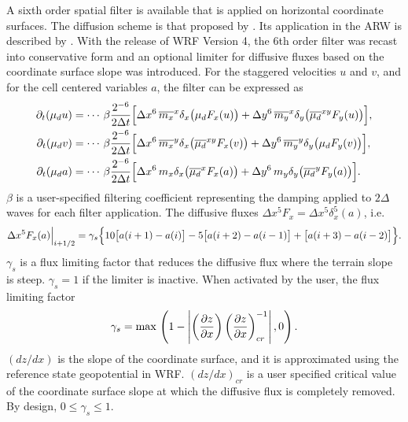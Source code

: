 A sixth order spatial filter is available that is applied on horizontal
coordinate surfaces.  
The diffusion scheme is that proposed by \cite{xue.2000}.  Its application
in the ARW is described by \cite{knievel.et.al.2007}.  With the release of WRF Version 4, the 6th order filter was recast into conservative form and an optional limiter for diffusive fluxes based on the coordinate surface slope was introduced.  For the staggered velocities $u$ and $v$, and for the cell centered variables $a$, the filter can be expressed as
%
%
\begin{align}
\partial_t (\mu_d u) &= \cdots \, \beta {2^{-6} \over 2 \Delta t} 
\Big[ \Delta x^6 \, \overline{m_x}^x \delta_x \big({\mu_d} F_x(u)\big) + \Delta y^6  \,\overline{m_y}^x \delta_y \big(\overline{\mu_d}^{xy} F_y(u)\big)\Big],
\label{filter6_u} \\
%
\partial_t (\mu_d v) &= \cdots \, \beta {2^{-6} \over 2 \Delta t} 
\Big[ \Delta x^6 \, \overline{m_x}^y \delta_x \big(\overline{\mu_d}^{xy} F_x(v)\big) + \Delta y^6  \,\overline{m_y}^y \delta_y \big({\mu_d} F_y(v)\big)\Big],
\label{filter6_v} \\
%
\partial_t (\mu_d a) &= \cdots \, \beta {2^{-6} \over 2 \Delta t} 
\Big[ \Delta x^6 \, {m_x} \delta_x \big(\overline{\mu_d}^{x} F_x(a)\big) + \Delta y^6  \,{m_y} \delta_y \big(\overline{\mu_d}^y F_y(a)\big)\Big].
\label{filter6_a}
\end{align}
%
\noindent
$\beta$ is a user-specified filtering coefficient representing the
damping applied to $2\Delta$ waves for each filter application.  
The diffusive fluxes $\Delta x^5 F_x = \Delta x^5 \delta_x^5 (a)$, i.e.
%
\begin{equation} 
 \Delta x^5 F_x (a) {\Big|}_{i+1/2} = \gamma_s \Big\{ 10 \big[ a(i+1) - a(i) \big] - 5 \big[ a(i+2) - a(i-1) \big] + \big[ a(i+3) - a(i-2) \big] \Big\}.
\notag
\end{equation}
\noindent
$\gamma_s$ is a flux limiting factor that reduces the diffusive flux where the terrain slope is steep.  $\gamma_s = 1$ if the limiter is inactive.  When activated by the user, the flux limiting factor
%
\begin{equation}
\gamma_s = \hbox{max} \,\left(1 - \left| \left({\partial z \over \partial x} \right) \left( {\partial z \over \partial x}\right)^{-1}_{cr} \right| , 0 \right).
\notag
\end{equation}
%
\noindent
$(dz/dx)$ is the slope of the coordinate surface, and it is approximated using the reference state geopotential in WRF.   $(dz/dx)_{cr}$ is a user specified critical value of the coordinate surface slope at which the diffusive flux is completely removed.  By design, $ 0 \le \gamma_s \le 1$.

